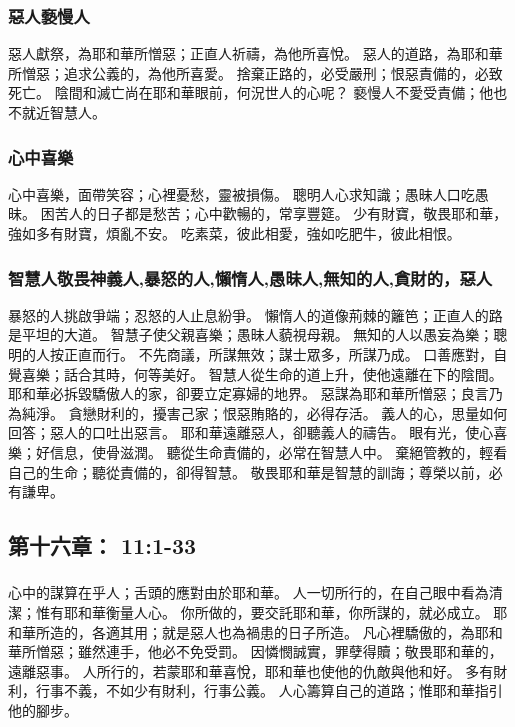 \subsubsection{惡人褻慢人}
惡人獻祭，為耶和華所憎惡；正直人祈禱，為他所喜悅。
惡人的道路，為耶和華所憎惡；追求公義的，為他所喜愛。
捨棄正路的，必受嚴刑；恨惡責備的，必致死亡。
陰間和滅亡尚在耶和華眼前，何況世人的心呢？
褻慢人不愛受責備；他也不就近智慧人。

\subsubsection{心中喜樂}
心中喜樂，面帶笑容；心裡憂愁，靈被損傷。
聰明人心求知識；愚昧人口吃愚昧。
困苦人的日子都是愁苦；心中歡暢的，常享豐筵。
少有財寶，敬畏耶和華，強如多有財寶，煩亂不安。
吃素菜，彼此相愛，強如吃肥牛，彼此相恨。

\subsubsection{智慧人敬畏神義人,暴怒的人,懶惰人,愚昧人,無知的人,貪財的，惡人}
暴怒的人挑啟爭端；忍怒的人止息紛爭。
懶惰人的道像荊棘的籬笆；正直人的路是平坦的大道。
智慧子使父親喜樂；愚昧人藐視母親。
無知的人以愚妄為樂；聰明的人按正直而行。
不先商議，所謀無效；謀士眾多，所謀乃成。
口善應對，自覺喜樂；話合其時，何等美好。
智慧人從生命的道上升，使他遠離在下的陰間。
耶和華必拆毀驕傲人的家，卻要立定寡婦的地界。
惡謀為耶和華所憎惡；良言乃為純淨。
貪戀財利的，擾害己家；恨惡賄賂的，必得存活。
義人的心，思量如何回答；惡人的口吐出惡言。
耶和華遠離惡人，卻聽義人的禱告。
眼有光，使心喜樂；好信息，使骨滋潤。
聽從生命責備的，必常在智慧人中。
棄絕管教的，輕看自己的生命；聽從責備的，卻得智慧。
敬畏耶和華是智慧的訓誨；尊榮以前，必有謙卑。

\subsection{第十六章：   11:1-33}
\subsubsection{ }
心中的謀算在乎人；舌頭的應對由於耶和華。
人一切所行的，在自己眼中看為清潔；惟有耶和華衡量人心。
你所做的，要交託耶和華，你所謀的，就必成立。
耶和華所造的，各適其用；就是惡人也為禍患的日子所造。
凡心裡驕傲的，為耶和華所憎惡；雖然連手，他必不免受罰。
因憐憫誠實，罪孽得贖；敬畏耶和華的，遠離惡事。
人所行的，若蒙耶和華喜悅，耶和華也使他的仇敵與他和好。
多有財利，行事不義，不如少有財利，行事公義。
人心籌算自己的道路；惟耶和華指引他的腳步。

